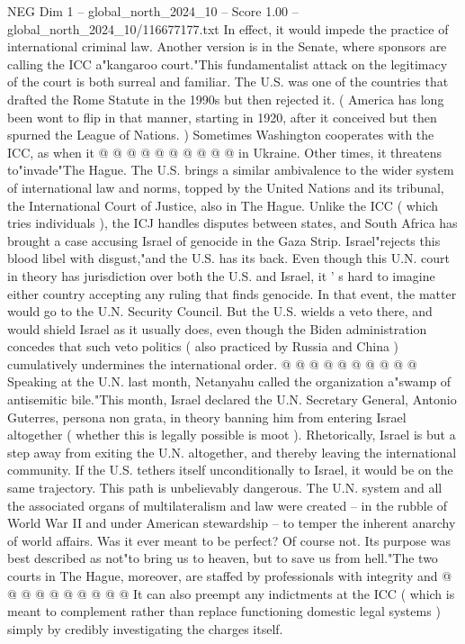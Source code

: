 \begin{textsample}{NEG Dim 1 – global\_north\_2024\_10 – Score 1.00 – global\_north\_2024\_10/116677177.txt}
In effect, it would impede the practice of international criminal law.
Another version is in the Senate, where sponsors are calling the ICC a"kangaroo court."This fundamentalist attack on the legitimacy of the court is both surreal and familiar.
The U.S. was one of the countries that drafted the Rome Statute in the 1990s but then rejected it. ( America has long been wont to flip in that manner, starting in 1920, after it conceived but then spurned the League of Nations. ) Sometimes Washington cooperates with the ICC, as when it @ @ @ @ @ @ @ @ @ @ in Ukraine.
Other times, it threatens to"invade"The Hague.
The U.S. brings a similar ambivalence to the wider system of international law and norms, topped by the United Nations and its tribunal, the International Court of Justice, also in The Hague.
Unlike the ICC ( which tries individuals ), the ICJ handles disputes between states, and South Africa has brought a case accusing Israel of genocide in the Gaza Strip.
Israel"rejects this blood libel with disgust,"and the U.S. has its back.
Even though this U.N. court in theory has jurisdiction over both the U.S. and Israel, it ' s hard to imagine either country accepting any ruling that finds genocide.
In that event, the matter would go to the U.N.
Security Council.
But the U.S. wields a veto there, and would shield Israel as it usually does, even though the Biden administration concedes that such veto politics ( also practiced by Russia and China ) cumulatively undermines the international order. @ @ @ @ @ @ @ @ @ @ Speaking at the U.N. last month, Netanyahu called the organization a"swamp of antisemitic bile."This month, Israel declared the U.N.
Secretary General, Antonio Guterres, persona non grata, in theory banning him from entering Israel altogether ( whether this is legally possible is moot ).
Rhetorically, Israel is but a step away from exiting the U.N. altogether, and thereby leaving the international community.
If the U.S. tethers itself unconditionally to Israel, it would be on the same trajectory.
This path is unbelievably dangerous.
The U.N. system and all the associated organs of multilateralism and law were created -- in the rubble of World War II and under American stewardship -- to temper the inherent anarchy of world affairs.
Was it ever meant to be perfect?
Of course not.
Its purpose was best described as not"to bring us to heaven, but to save us from hell."The two courts in The Hague, moreover, are staffed by professionals with integrity and @ @ @ @ @ @ @ @ @ @ It can also preempt any indictments at the ICC ( which is meant to complement rather than replace functioning domestic legal systems ) simply by credibly investigating the charges itself.

\end{textsample}
